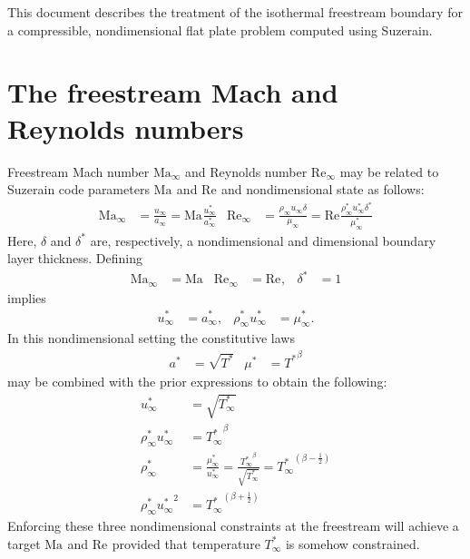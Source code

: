 \documentclass[letterpaper,11pt,nointlimits,reqno]{amsart}
\newcommand{\Mach}[1][]{\ensuremath{\mbox{Ma}_{#1}}}
\newcommand{\Reynolds}[1][]{\ensuremath{\mbox{Re}_{#1}}}
\begin{document}
This document describes the treatment of the isothermal freestream boundary for
a compressible, nondimensional flat plate problem computed using Suzerain.

\section{The freestream Mach and Reynolds numbers}


Freestream Mach number $\Mach[\infty]$ and Reynolds number $\Reynolds[\infty]$
may be related to Suzerain code parameters $\Mach$ and $\Reynolds$ and
nondimensional state as follows:
\begin{align}
  \Mach[\infty]{}
  &=         \frac{u_\infty     }{a_\infty     }
   = \Mach{} \frac{u_\infty^\ast}{a_\infty^\ast}
&
  \Reynolds[\infty]{}
  &=             \frac{\rho_\infty      u_\infty      \delta     }
                      {\mu_\infty     }
   = \Reynolds{} \frac{\rho_\infty^\ast u_\infty^\ast \delta^\ast}
                      {\mu_\infty^\ast}
\end{align}
Here, $\delta$ and $\delta^\ast$ are, respectively, a nondimensional and
dimensional boundary layer thickness.
Defining
\begin{align}
  \Mach[\infty]{} &= \Mach
& \Reynolds[\infty]{} &= \Reynolds,
& \delta^\ast &= 1
\end{align}
implies
\begin{align}
  u_\infty^\ast   &= a_\infty^\ast,
&
  \rho_\infty^\ast u_\infty^\ast &= \mu_\infty^\ast
.
\end{align}
In this nondimensional setting the constitutive laws
\begin{align}
  a^\ast &= \sqrt{T^\ast}
&\mu^\ast &= {T^\ast}^\beta
\end{align}
may be combined with the prior expressions to obtain the following:
\begin{align}
  \label{eq:u_target}
  u_\infty^\ast &= \sqrt{T_\infty^\ast}
\\
  \label{eq:mx_target}
  \rho_\infty^\ast u_\infty^\ast &= {T_\infty^\ast}^\beta
\\
  \label{eq:rho_target}
  \rho_\infty^\ast &= \frac{\mu_\infty^\ast}{u_\infty^\ast}
                    = \frac{{T_\infty^\ast}^\beta}{\sqrt{T_\infty^\ast}}
                    = {T_\infty^\ast}^{\left(\beta-\frac{1}{2}\right)}
\\
  \label{eq:ke_target}
  \rho_\infty^\ast {u_\infty^\ast}^2
&=
  {T_\infty^\ast}^{\left(\beta + \frac{1}{2}\right)}
\end{align}
Enforcing these three nondimensional constraints at the freestream will achieve
a target $\Mach$ and $\Reynolds$ provided that temperature $T_\infty^\ast$ is
somehow constrained.
\end{document}
